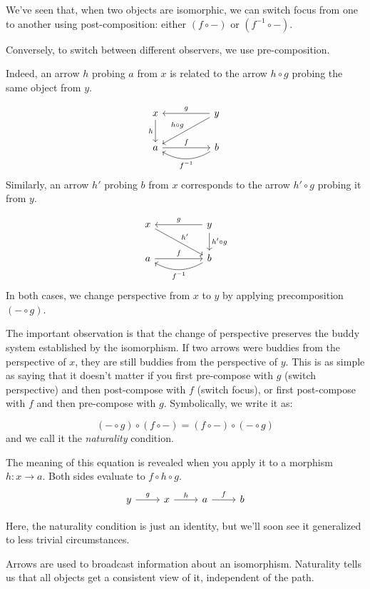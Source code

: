 \documentclass[DaoFP]{subfiles}
\begin{document}
We've seen that, when two objects are isomorphic, we can switch focus from one to another using post-composition: either $(f \circ -)$ or $(f^{-1} \circ -)$. 

Conversely, to switch between different observers, we use pre-composition. 

Indeed, an arrow $h$ probing $a$ from $x$ is related to the arrow $h\circ g$ probing the same object from $y$.

\[
 \begin{tikzcd}
 x
 \arrow[d, "h"']
 && y
 \arrow[ll, "g"']
  \arrow[dll, "h \circ g"']
 \\
 a
 \arrow[rr, "f"]
  && b
 \arrow[ll, bend left,  "f^{-1}"]
 \end{tikzcd}
\]
Similarly, an arrow $h'$ probing $b$ from $x$ corresponds to the arrow $h' \circ g$ probing it from $y$. 

\[
 \begin{tikzcd}
 x
 \arrow[drr, "h'"]
 && y
 \arrow[ll, "g"']
  \arrow[d, "h' \circ g"]
 \\
 a
 \arrow[rr, "f"]
  && b
 \arrow[ll, bend left,  "f^{-1}"]
 \end{tikzcd}
\]
In both cases, we change perspective from $x$ to $y$ by applying precomposition $(- \circ g)$.

The important observation is that the change of perspective preserves the buddy system established by the isomorphism. If two arrows were buddies from the perspective of $x$, they are still buddies from the perspective of $y$. This is as simple as saying that it doesn't matter if you first pre-compose with $g$ (switch perspective) and then post-compose with $f$ (switch focus), or first post-compose with $f$ and then pre-compose with $g$. Symbolically, we write it as:

\[(- \circ g) \circ (f \circ -) = (f \circ -) \circ (- \circ g)\]
and we call it the \emph{naturality} condition.

The meaning of this equation is revealed when you apply it to a morphism $h \colon x \to a$. Both sides evaluate to $f \circ h \circ g$.  \[
 \begin{tikzcd}
 y \arrow[r, "g"] &x \arrow[r, "h"] & a \arrow[r, "f"] & b
\end{tikzcd}
\]

Here, the naturality condition is just an identity, but we'll soon see it generalized to less trivial circumstances.


Arrows are used to broadcast information about an isomorphism. Naturality tells us that all objects get a consistent view of it, independent of the path. 
\end{document}
